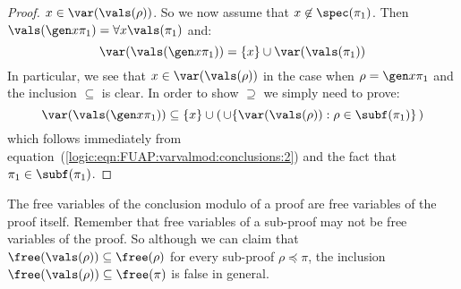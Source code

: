 \begin{proof}
$x\in\var(\vals(\rho))$. So we now assume that
$x\not\in\spec(\pi_{1})$. Then $\vals(\gen x\pi_{1})=\forall
x\vals(\pi_{1})$ and:
    \begin{equation}\label{logic:eqn:FUAP:varvalmod:conclusions:2}
    \var(\vals(\gen x\pi_{1}))=\{x\}\cup\var(\vals(\pi_{1}))
    \end{equation}
In particular, we see that $x\in\var(\vals(\rho))$ in the case when
$\rho=\gen x\pi_{1}$ and the inclusion $\subseteq$ is clear. In
order to show $\supseteq$ we simply need to prove:
    \[
    \var(\vals(\gen x\pi_{1}))\subseteq
    \{x\}\cup(\,\cup\{\var(\vals(\rho)):\rho\in\subf(\pi_{1})\}\,)
    \]
which follows immediately from
equation~(\ref{logic:eqn:FUAP:varvalmod:conclusions:2}) and the fact
that $\pi_{1}\in\subf(\pi_{1})$.
\end{proof}

The free variables of the conclusion modulo of a proof are free
variables of the proof itself. Remember that free variables of a
sub-proof may not be free variables of the proof. So although we can
claim that $\free(\vals(\rho))\subseteq\free(\rho)$ for every
sub-proof $\rho\preceq\pi$, the inclusion
$\free(\vals(\rho))\subseteq\free(\pi)$ is false in general.


